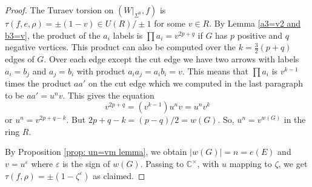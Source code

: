\documentclass[11pt]{article}
\numberwithin{equation}{section}\providecommand{\dpl}{\displaystyle}
\theoremstyle{plain}
\theoremstyle{definition}
\let\ve\varepsilon
\newcommand{\bC}{\mathbb{C}}\newcommand{\bD}{\mathbb{D}}
\begin{document}
\begin{proof}
The Turaev torsion on $(W|_{\Sigma^0},f)$ is $\tau(f,e,\rho)=\pm(1-v)\in U(R)/\pm 1$ for some $v\in R$. By Lemma \ref{a3=v2 and b3=v}, the product of the $a_i$ labels is $\prod a_i=v^{2p+q}$ if $G$ has $p$ positive and $q$ negative vertices. This product can also be computed over the $k=\frac32(p+q)$ edges of $G$. Over each edge except the cut edge we have two arrows with labels $a_i=b_j$ and $a_j=b_i$ with product $a_ia_j=a_ib_i=v$. This means that $\prod a_i$ is $v^{k-1}$ times the product $aa'$ on the cut edge which we computed in the last paragraph to be $a a'=u^nv$. This gives the equation
\[
v^{2p+q}=(v^{k-1})u^nv=u^nv^k
\]
or $u^n=v^{2p+q-k}$. But $2p+q-k=(p-q)/2=w(G)$. So, $u^n=v^{w(G)}$ in the ring $R$.

By Proposition \ref{prop: un=vm lemma}, we obtain $|w(G)|=n=e(E)$ and $v=u^{\ve}$ where $\ve$ is the sign of $w(G)$. Passing to $\bC^\times$, with $u$ mapping to $\zeta$, we get $\tau(f,\rho)=\pm(1-\zeta^\ve)$ as claimed.
\end{proof}
\end{document}
